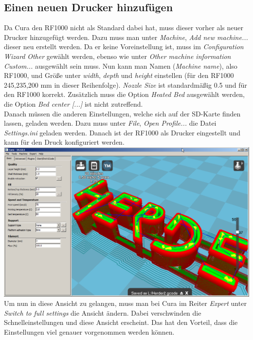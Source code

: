 \documentclass[11pt,a4paper]{scrartcl}
\begin{document}
\subsection{Einen neuen Drucker hinzufügen}
Da Cura den RF1000 nicht als Standard dabei hat, muss dieser vorher als neuer Drucker hinzugefügt werden. Dazu muss man unter \textit{Machine}, \textit{Add new machine...} dieser neu erstellt werden. Da er keine Voreinstellung ist, muss im \textit{Configuration Wizard} \textit{Other} gewählt werden, ebenso wie unter \textit{Other machine information} \textit{Custom...} ausgewählt sein muss. Nun kann man Namen (\textit{Machine name}), also RF1000, und Größe unter \textit{width}, \textit{depth} und \textit{height} einstellen (für den RF1000 245,235,200 mm in dieser Reihenfolge). \textit{Nozzle Size} ist standardmäßig 0.5 und für den RF1000 korrekt. Zusätzlich muss die Option \textit{Heated Bed} ausgewählt werden, die Option \textit{Bed center [...]} ist nicht zutreffend.\\
Danach müssen die anderen Einstellungen, welche sich auf der SD-Karte finden lassen, geladen werden. Dazu muss unter \textit{File}, \textit{Open Profile...} die Datei \textit{Settings.ini} geladen werden. Danach ist der RF1000 als Drucker eingestellt und kann für den Druck konfiguriert werden.\\
\includegraphics[scale=0.38]{res/Cura-window.png}\\

Um nun in diese Ansicht zu gelangen, muss man bei Cura im Reiter \textit{Expert} unter \textit{Switch to full settings} die Ansicht ändern. Dabei verschwinden die Schnelleinstellungen und diese Ansicht erscheint. Das hat den Vorteil, dass die Einstellungen viel genauer vorgenommen werden können.\\
\end{document}
